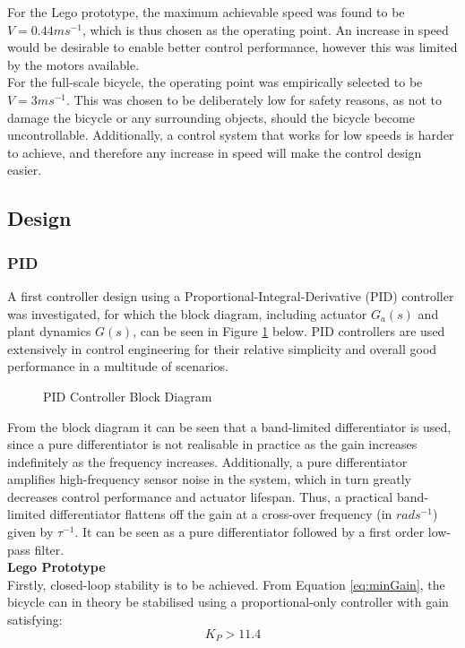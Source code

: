 For the Lego prototype, the maximum achievable speed was found to be $V=0.44ms^{-1}$, which is thus chosen as the operating point. An increase in speed would be desirable to enable better control performance, however this was limited by the motors available. \\

For the full-scale bicycle, the operating point was empirically selected to be $V=3ms^{-1}$. This was chosen to be deliberately low for safety reasons, as not to damage the bicycle or any surrounding objects, should the bicycle become uncontrollable. Additionally, a control system that works for low speeds is harder to achieve, and therefore any increase in speed will make the control design easier.

\subsection{Design}
\subsubsection{PID}
A first controller design using a Proportional-Integral-Derivative (PID) controller was investigated, for which the block diagram, including actuator $G_a(s)$ and plant dynamics $G(s)$, can be seen in Figure \ref{fig:PID} below. PID controllers are used extensively in control engineering for their relative simplicity and overall good performance in a multitude of scenarios.

\begin{figure}[H]
	\centering
    \def\svgwidth{0.75\textwidth}
    
    \caption{PID Controller Block Diagram}
	\label{fig:PID}
\end{figure}

From the block diagram it can be seen that a band-limited differentiator is used, since a pure differentiator is not realisable in practice as the gain increases indefinitely as the frequency increases. Additionally, a pure differentiator amplifies high-frequency sensor noise in the system, which in turn greatly decreases control performance and actuator lifespan. Thus, a practical band-limited differentiator flattens off the gain at a cross-over frequency (in $rads^{-1}$) given by $\tau^{-1}$. It can be seen as a pure differentiator followed by a first order low-pass filter. \\

\textbf{Lego Prototype} \\
Firstly, closed-loop stability is to be achieved. From Equation \ref{eq:minGain}, the bicycle can in theory be stabilised using a proportional-only controller with gain satisfying:
\begin{equation*}
K_P > 11.4
\end{equation*}


